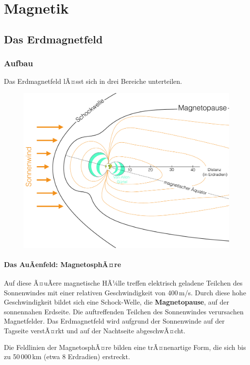 \chapter{Magnetik}

\section{Das Erdmagnetfeld}
\subsection{Aufbau}

Das Erdmagnetfeld lÃ¤sst sich in drei Bereiche unterteilen. 


\begin{figure}[H]
	\centering
	\includegraphics[width = \textwidth]{MagnetikBilder/Erdmagnetfeld}
\end{figure}

\subsubsection{Das AuÃenfeld: MagnetosphÃ¤re}
Auf diese Ã¤uÃere magnetische HÃ¼lle treffen elektrisch geladene Teilchen des Sonnenwindes mit einer relativen Geschwindigkeit von 400\,m/s. Durch diese hohe Geschwindigkeit bildet sich eine Schock-Welle, die \textbf{Magnetopause}, auf der sonnennahen Erdseite.
Die auftreffenden Teilchen des Sonnenwindes verursachen Magnetfelder. Das Erdmagnetfeld wird aufgrund der Sonnenwinde auf der Tagseite verstÃ¤rkt und auf der Nachtseite abgeschwÃ¤cht.

Die Feldlinien der MagnetosphÃ¤re bilden eine trÃ¤nenartige Form, die sich bis zu 50\,000\,km (etwa 8 Erdradien) erstreckt.


